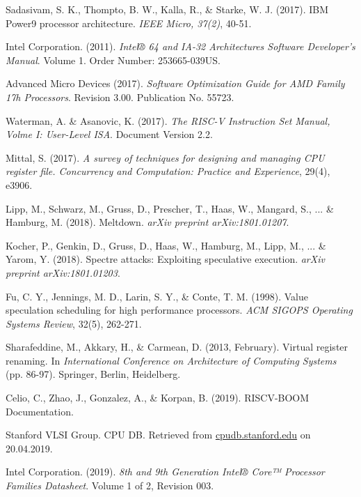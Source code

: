 \documentclass[12pt,a4paper]{article} %
\begin{document}
{\begin{thebibliography}{56}
    Sadasivam, S. K., Thompto, B. W., Kalla, R., \& Starke, W. J. (2017). IBM Power9 processor architecture. \textit{IEEE Micro, 37(2)}, 40-51.
    
    Intel Corporation. (2011). \textit{Intel® 64 and IA-32 Architectures Software Developer’s Manual}. Volume 1. Order Number: 253665-039US. 
        
    Advanced Micro Devices (2017). \textit{Software Optimization Guide for
    	AMD Family 17h Processors}. Revision 3.00. Publication No. 55723.
    
    Waterman, A. \& Asanovic, K. (2017). \textit{The RISC-V Instruction Set Manual, Volme I: User-Level ISA}. Document Version 2.2. 
    
    Mittal, S. (2017). \textit{A survey of techniques for designing and managing CPU register file. Concurrency and Computation: Practice and Experience}, 29(4), e3906. 
    
    Lipp, M., Schwarz, M., Gruss, D., Prescher, T., Haas, W., Mangard, S., ... \& Hamburg, M. (2018). Meltdown. \textit{arXiv preprint arXiv:1801.01207}.
    
    Kocher, P., Genkin, D., Gruss, D., Haas, W., Hamburg, M., Lipp, M., ... \& Yarom, Y. (2018). Spectre attacks: Exploiting speculative execution. \textit{arXiv preprint arXiv:1801.01203}.
        
    Fu, C. Y., Jennings, M. D., Larin, S. Y., \& Conte, T. M. (1998). Value speculation scheduling for high performance processors. \textit{ACM SIGOPS Operating Systems Review}, 32(5), 262-271.
    
    Sharafeddine, M., Akkary, H., \& Carmean, D. (2013, February). Virtual register renaming. In \textit{International Conference on Architecture of Computing Systems} (pp. 86-97). Springer, Berlin, Heidelberg.
    
   	Celio, C., Zhao, J., Gonzalez, A., \& Korpan, B. (2019). RISCV-BOOM Documentation.
    
    Stanford VLSI Group. CPU DB. Retrieved from \url{cpudb.stanford.edu} on 20.04.2019.
    
    Intel Corporation. (2019). \textit{8th and 9th Generation Intel® Core™ Processor Families Datasheet}. Volume 1 of 2, Revision 003. 
    

\end{thebibliography}}
\end{document}
